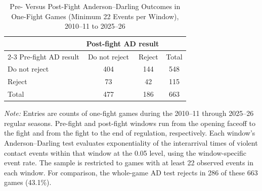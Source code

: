 \begin{table}[htbp]
\centering
\caption{Pre- Versus Post-Fight Anderson--Darling Outcomes in One-Fight Games (Minimum 22 Events per Window), 2010--11 to 2025--26}
\label{tab:one_fight_AD_rejection_min_22_20102011_20252026}
\small
\renewcommand{\arraystretch}{1.15}
\setlength{\tabcolsep}{6pt}

\begin{tabular*}{0.78\textwidth}{@{\extracolsep{\fill}}lccc}
\toprule
 & \multicolumn{2}{c}{Post-fight AD result} & \\
\cmidrule(lr){2-3}
Pre-fight AD result & Do not reject & Reject & Total \\
\midrule
Do not reject & 404 & 144 & 548 \\
Reject & 73 & 42 & 115 \\
\midrule
Total & 477 & 186 & 663 \\
\bottomrule
\end{tabular*}

\vspace{0.4em}
\parbox{0.78\textwidth}{
\footnotesize
\textit{Note:} Entries are counts of one-fight games during the 2010--11 through 2025--26 regular seasons. Pre-fight and post-fight windows run from the opening faceoff to the fight and from the fight to the end of regulation, respectively. Each window's Anderson--Darling test evaluates exponentiality of the interarrival times of violent contact events within that window at the 0.05 level, using the window-specific event rate. The sample is restricted to games with at least 22 observed events in each window. For comparison, the whole-game AD test rejects in 286 of these 663 games (43.1\%).
}
\end{table}
